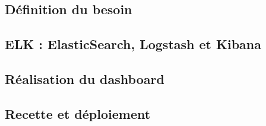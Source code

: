\subsection{Définition du besoin}
	

\subsection{ELK : ElasticSearch, Logstash et Kibana}
	
	
\subsection{Réalisation du dashboard}
	
	
\subsection{Recette et déploiement}
	